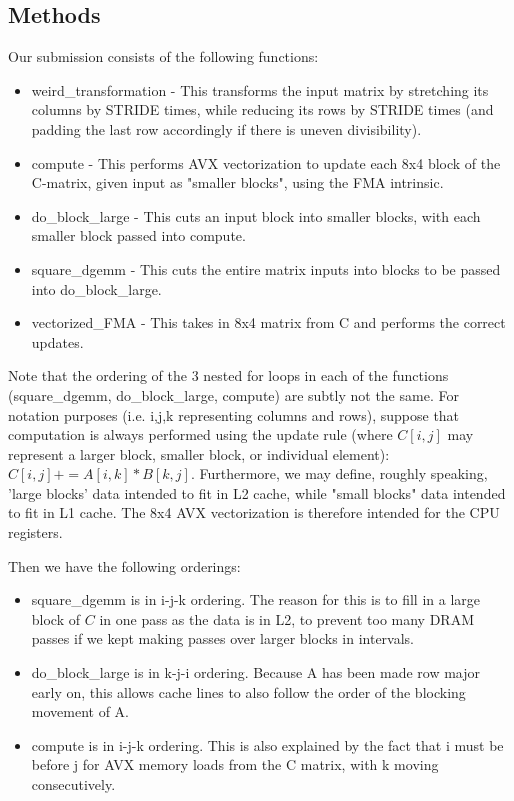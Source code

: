 \documentclass[12pt]{article}
\begin{document}
\subsection{Methods}
Our submission consists of the following functions:
\begin{itemize}
\item weird\_transformation - This transforms the input matrix by stretching its columns by STRIDE times, while reducing its rows by STRIDE times (and padding the last row accordingly if there is uneven divisibility).
\item compute - This performs AVX vectorization to update each 8x4 block of the C-matrix, given input as "smaller blocks", using the FMA intrinsic. 
\item do\_block\_large - This cuts an input block into smaller blocks, with each smaller block passed into compute. 
\item square\_dgemm - This cuts the entire matrix inputs into blocks to be passed into do\_block\_large. 
\item vectorized\_FMA - This takes in 8x4 matrix from C and performs the correct updates. 
\end{itemize}
Note that the ordering of the 3 nested for loops in each of the functions (square\_dgemm, do\_block\_large, compute) are subtly not the same. For notation purposes (i.e. i,j,k representing columns and rows), suppose that computation is always performed using the update rule (where $C[i,j]$ may represent a larger block, smaller block, or individual element): $C[i,j] += A[i, k]*B[k, j]$. Furthermore, we may define, roughly speaking, 'large blocks' data intended to fit in L2 cache, while "small blocks" data intended to fit in L1 cache. The 8x4 AVX vectorization is therefore intended for the CPU registers. 

Then we have the following orderings: 
\begin{itemize}
\item square\_dgemm is in i-j-k ordering. The reason for this is to fill in a large block of $C$ in one pass as the data is in L2, to prevent too many DRAM passes if we kept making passes over larger blocks in intervals.  
\item do\_block\_large is in k-j-i ordering. Because A has been made row major early on, this allows cache lines to also follow the order of the blocking movement of A. 
\item compute is in i-j-k ordering. This is also explained by the fact that i must be before j for AVX memory loads from the C matrix, with k moving consecutively. 
\end{itemize}
\end{document}
